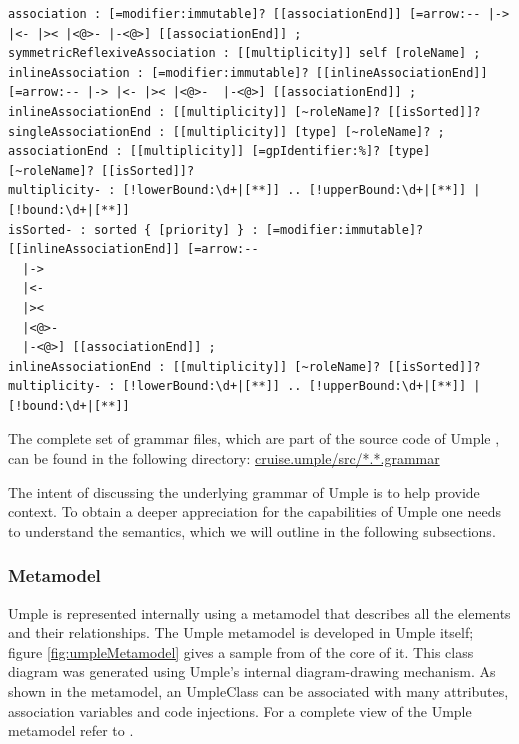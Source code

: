 \begin{lstlisting}[language={grammar}, label=lst:fullGrammar3,caption=Umple Grammar for associations]
association : [=modifier:immutable]? [[associationEnd]] [=arrow:-- |-> |<- |>< |<@>- |-<@>] [[associationEnd]] ;
symmetricReflexiveAssociation : [[multiplicity]] self [roleName] ;
inlineAssociation : [=modifier:immutable]? [[inlineAssociationEnd]] [=arrow:-- |-> |<- |>< |<@>-  |-<@>] [[associationEnd]] ;
inlineAssociationEnd : [[multiplicity]] [~roleName]? [[isSorted]]?
singleAssociationEnd : [[multiplicity]] [type] [~roleName]? ;
associationEnd : [[multiplicity]] [=gpIdentifier:%]? [type] [~roleName]? [[isSorted]]?
multiplicity- : [!lowerBound:\d+|[**]] .. [!upperBound:\d+|[**]] | [!bound:\d+|[**]]
isSorted- : sorted { [priority] } : [=modifier:immutable]? [[inlineAssociationEnd]] [=arrow:-- 
  |-> 
  |<- 
  |>< 
  |<@>- 
  |-<@>] [[associationEnd]] ;
inlineAssociationEnd : [[multiplicity]] [~roleName]? [[isSorted]]?
multiplicity- : [!lowerBound:\d+|[**]] .. [!upperBound:\d+|[**]] | [!bound:\d+|[**]]
\end{lstlisting}

The complete set of grammar files, which are part of the source code of Umple \cite{umpleRepository}, can be found in the following directory:
\url{cruise.umple/src/*.*.grammar}

The intent of discussing the underlying grammar of Umple is to help provide context. To obtain a deeper appreciation for the capabilities of Umple one needs to understand the semantics, which we will outline in the following subsections.

\subsubsection{Metamodel}
Umple is represented internally using a metamodel that describes all the elements and their relationships. The Umple metamodel is developed in Umple itself; figure \ref{fig:umpleMetamodel} gives a sample from of the core of it. This class diagram was generated using Umple's internal diagram-drawing mechanism. As shown in the metamodel, an UmpleClass can be associated with many attributes, association variables and code injections. For a complete view of the Umple metamodel refer to \cite{UmpleMetamodel}.

